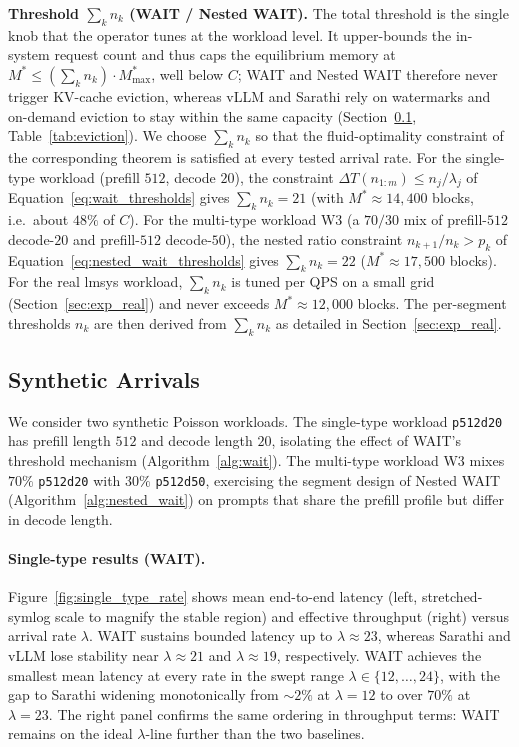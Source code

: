 \textbf{Threshold $\sum_k n_k$ (WAIT / Nested WAIT).} The total threshold is the single knob that the operator tunes at the workload level. It upper-bounds the in-system request count and thus caps the equilibrium memory at $M^{*} \leq (\sum_k n_k) \cdot M^*_{\max}$, well below $C$; WAIT and Nested WAIT therefore never trigger KV-cache eviction, whereas vLLM and Sarathi rely on watermarks and on-demand eviction to stay within the same capacity (Section~\ref{sec:exp_synthetic}, Table~\ref{tab:eviction}). We choose $\sum_k n_k$ so that the fluid-optimality constraint of the corresponding theorem is satisfied at every tested arrival rate. For the single-type workload (prefill $512$, decode $20$), the constraint $\Delta T(n_{1:m}) \leq n_j / \lambda_j$ of Equation~\eqref{eq:wait_thresholds} gives $\sum_k n_k = 21$ (with $M^{*} \approx 14{,}400$ blocks, i.e.\ about $48\%$ of $C$). For the multi-type workload W3 (a $70/30$ mix of prefill-$512$ decode-$20$ and prefill-$512$ decode-$50$), the nested ratio constraint $n_{k+1}/n_k > p_k$ of Equation~\eqref{eq:nested_wait_thresholds} gives $\sum_k n_k = 22$ ($M^{*} \approx 17{,}500$ blocks). For the real lmsys workload, $\sum_k n_k$ is tuned per QPS on a small grid (Section~\ref{sec:exp_real}) and never exceeds $M^{*} \approx 12{,}000$ blocks. The per-segment thresholds $n_k$ are then derived from $\sum_k n_k$ as detailed in Section~\ref{sec:exp_real}.


\subsection{Synthetic Arrivals}
\label{sec:exp_synthetic}

We consider two synthetic Poisson workloads. The single-type workload \texttt{p512d20} has prefill length $512$ and decode length $20$, isolating the effect of WAIT's threshold mechanism (Algorithm~\ref{alg:wait}). The multi-type workload W3 mixes $70\%$ \texttt{p512d20} with $30\%$ \texttt{p512d50}, exercising the segment design of Nested WAIT (Algorithm~\ref{alg:nested_wait}) on prompts that share the prefill profile but differ in decode length.

\paragraph{Single-type results (WAIT).}
Figure~\ref{fig:single_type_rate} shows mean end-to-end latency (left, stretched-symlog scale to magnify the stable region) and effective throughput (right) versus arrival rate $\lambda$. WAIT sustains bounded latency up to $\lambda \approx 23$, whereas Sarathi and vLLM lose stability near $\lambda \approx 21$ and $\lambda \approx 19$, respectively. WAIT achieves the smallest mean latency at every rate in the swept range $\lambda \in \{12, \dots, 24\}$, with the gap to Sarathi widening monotonically from ${\sim}2\%$ at $\lambda = 12$ to over $70\%$ at $\lambda = 23$. The right panel confirms the same ordering in throughput terms: WAIT remains on the ideal $\lambda$-line further than the two baselines.

